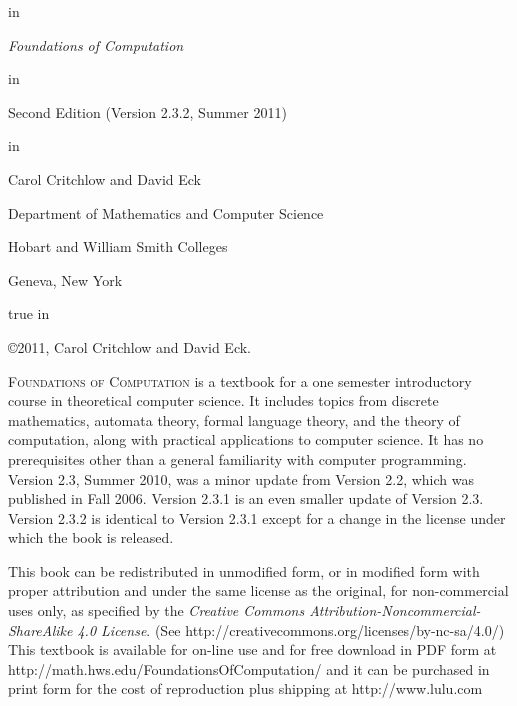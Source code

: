 \documentclass{book}
\theoremstyle{definition}
\newcommand*{\largesize}[1]{{\Large#1}}
\newcommand*{\startchapter}[1]{\textsc{\largesize #1}}  %
\begin{document}
\frontmatter

\begin{titlepage}

 in 
\centerline{\Huge \textit{Foundations of Computation}}
 in
\centerline{Second Edition (Version 2.3.2, Summer 2011)}
 in
\centerline{\Large Carol Critchlow and David Eck}
\medskip
\centerline{Department of Mathematics and Computer Science}
\smallskip
\centerline{Hobart and William Smith Colleges}
\smallskip
\centerline{Geneva, New York}



\newpage
{} true in

{\narrower\narrower

\noindent \copyright 2011, Carol Critchlow and David Eck.
\bigskip

\noindent \startchapter{Foundations of Computation} is a textbook for a one semester introductory course
in theoretical computer science.  It includes topics from discrete mathematics,
automata theory, formal language theory, and the theory of computation, along with
practical applications to computer science. It has no prerequisites other than a
general familiarity with computer programming.  Version 2.3, Summer 2010, was a minor 
update from Version 2.2, which was published in Fall 2006.  Version 2.3.1 is an even
smaller update of Version 2.3.  Version 2.3.2 is identical to Version 2.3.1 except for
a change in the license under which the book is released.

\bigskip


\small{%
\noindent This book can be redistributed in unmodified form,
or in modified form with proper attribution and under the same license as the original, 
for non-commercial uses only, as specified by the
\textit{Creative Commons Attribution-Noncommercial-ShareAlike 4.0 License}.
(See http://creativecommons.org/licenses/by-nc-sa/4.0/)\\[8pt]
This textbook is available for on-line use and for free download
in PDF form at http://math.hws.edu/FoundationsOfComputation/
and it can be purchased in print form for the cost of reproduction
plus shipping at http://www.lulu.com}


}



\end{titlepage}

\tableofcontents


%
%


\mainmatter







\printindex
\end{document}
